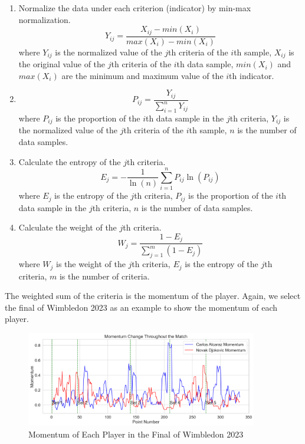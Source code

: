 \documentclass[12pt]{article}
\begin{document}
\begin{enumerate}
    \item Normalize the data under each criterion (indicator) by min-max normalization.
    \begin{equation}
        Y_{ij} = \frac{X_{ij}-min(X_i)}{max(X_i)-min(X_i)}
    \end{equation} where $Y_{ij}$ is the normalized value of the $j$th criteria of 
    the $i$th sample, $X_{ij}$ is the original value of the $j$th criteria of the $i$th data sample, $min(X_i)$ and $max(X_i)$ are the minimum and maximum value of the $i$th indicator.
    \item 
    \begin{equation}
        P_{ij} = \frac{Y_{ij}}{\sum_{i=1}^{n}Y_{ij}}
    \end{equation} where $P_{ij}$ is the proportion of the $i$th data sample in the $j$th criteria, $Y_{ij}$ is the normalized value of the $j$th criteria of the $i$th sample, $n$ is the number of data samples.
    \item Calculate the entropy of the $j$th criteria.
    \begin{equation}
        E_j = -\frac{1}{\ln(n)}\sum_{i=1}^{n}P_{ij}\ln(P_{ij})
    \end{equation} where $E_j$ is the entropy of the $j$th criteria, $P_{ij}$ is the proportion of the $i$th data sample in the $j$th criteria, $n$ is the number of data samples.
    \item Calculate the weight of the $j$th criteria.
    \begin{equation}
        W_j = \frac{1-E_j}{\sum_{j=1}^{m}(1-E_j)}
    \end{equation} where $W_j$ is the weight of the $j$th criteria, $E_j$ is the entropy of the $j$th criteria, $m$ is the number of criteria.
\end{enumerate}

The weighted sum of the criteria is the momentum of the player. Again, we select the final of Wimbledon 2023 as an example to show the momentum of each player.
\begin{figure}[h!]
    \centering
    \includegraphics[width=0.9\textwidth]{flow.png}
    \caption{Momentum of Each Player in the Final of Wimbledon 2023} 
    \label{fig:7}
\end{figure}
\end{document}
